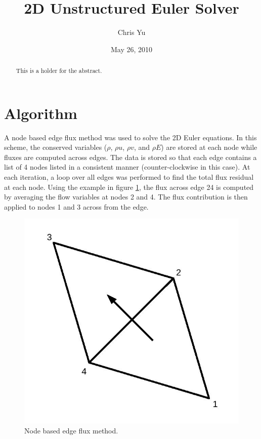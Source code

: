 \documentclass[12pt]{article}
\newcommand{\smalltitle}[2]{ 
 	#1
	\raggedright
	#2
}
\begin{document}
 \title{2D Unstructured Euler Solver}
 \author{Chris Yu}
 \date{May 26, 2010}
 \maketitle


 \begin{abstract}
 This is a holder for the abstract.
 \end{abstract}


 \section{Algorithm}

 A node based edge flux method was used to solve the 2D Euler equations. In this scheme, the conserved variables ($\rho$, $\rho u$, $\rho v$, and $\rho E$) are stored at each node while fluxes are computed across edges. The data is stored so that each edge contains a list of 4 nodes listed in a consistent manner (counter-clockwise in this case). At each iteration, a loop over all edges was performed to find the total flux residual at each node. Using the example in figure \ref{scheme}, the flux across edge 24 is computed by averaging the flow variables at nodes 2 and 4. The flux contribution is then applied to nodes 1 and 3 across from the edge.  

 \begin{figure}[htbp]
 \begin{center}
 \includegraphics[scale=0.25]{figs/triangle.jpg}
 \caption{Node based edge flux method.} \label{scheme}
 \end{center}
 \end{figure}
\end{document}
